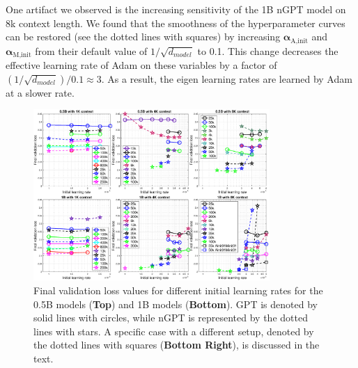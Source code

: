 \documentclass{article} %
\begin{document}
One artifact we observed is the increasing sensitivity of the 1B nGPT model on 8k context length. We found that the smoothness of the hyperparameter curves can be restored (see the dotted lines with squares) by increasing $\bm{\alpha}_{\text{A,init}}$ and $\bm{\alpha}_{\text{M,init}}$ from their default value of  
$1/\sqrt{d_{model}}$ to 0.1. This change decreases the effective learning rate of Adam on these variables by a factor of $(1/\sqrt{d_{model}})/0.1\approx 3$. As a result, the eigen learning rates are learned by Adam at a slower rate. 


\begin{figure}[h]
\begin{center}
    \includegraphics[width=0.8\textwidth]{figlrs.eps} 
\caption{ Final validation loss values for different initial learning rates for the 0.5B models (\textbf{Top}) and 1B models (\textbf{Bottom}). GPT is denoted by solid lines with circles, while nGPT is represented by the dotted lines with stars. A specific case with a different setup, denoted by the dotted lines with squares (\textbf{Bottom Right}), is discussed in the text.}
\label{figure_lrs}
\end{center}
\end{figure}
\end{document}

